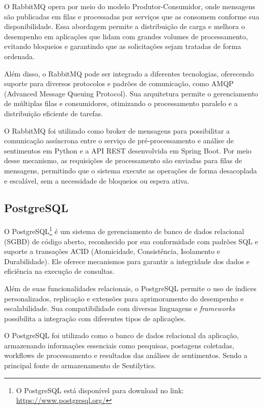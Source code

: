 \documentclass[
	12pt,				%
	oneside,			%
	a4paper,			%
	english,			%
	french,				%
	spanish,			%
	brazil				%
	]{abntex2}
\begin{document}
O RabbitMQ opera por meio do modelo Produtor-Consumidor, onde mensagens
são publicadas em filas e processadas por serviços que as consomem
conforme sua disponibilidade. Essa abordagem permite a distribuição de
carga e melhora o desempenho em aplicações que lidam com grandes volumes
de processamento, evitando bloqueios e garantindo que as solicitações
sejam tratadas de forma ordenada.

Além disso, o RabbitMQ pode ser integrado a diferentes tecnologias,
oferecendo suporte para diversos protocolos e padrões de comunicação,
como AMQP (Advanced Message Queuing Protocol). Sua arquitetura permite o
gerenciamento de múltiplas filas e consumidores, otimizando o
processamento paralelo e a distribuição eficiente de tarefas.

O RabbitMQ foi utilizado como broker de mensagens para possibilitar a
comunicação assíncrona entre o serviço de pré-processamento e análise de
sentimentos em Python e a API REST desenvolvida em Spring Boot. Por meio
desse mecanismo, as requisições de processamento são enviadas para filas
de mensagens, permitindo que o sistema execute as operações de forma
desacoplada e escalável, sem a necessidade de bloqueios ou espera ativa.

\hypertarget{postgresql}{%
\subsection{PostgreSQL}\label{postgresql}}

O PostgreSQL\footnote{O PostgreSQL está disponível para download no
  link: \url{https://www.postgresql.org/}} é um sistema de gerenciamento
de banco de dados relacional (SGBD) de código aberto, reconhecido por
sua conformidade com padrões SQL e suporte a transações ACID
(Atomicidade, Consistência, Isolamento e Durabilidade). Ele oferece
mecanismos para garantir a integridade dos dados e eficiência na
execução de consultas.

Além de suas funcionalidades relacionais, o PostgreSQL permite o uso de
índices personalizados, replicação e extensões para aprimoramento do
desempenho e escalabilidade. Sua compatibilidade com diversas linguagens
e \emph{frameworks} possibilita a integração com diferentes tipos de
aplicações.

O PostgreSQL foi utilizado como o banco de dados relacional da
aplicação, armazenando informações essenciais como pesquisas, postagens
coletadas, workflows de processamento e resultados das análises de
sentimentos. Sendo a principal fonte de armazenamento de Sentilytics.
\end{document}
